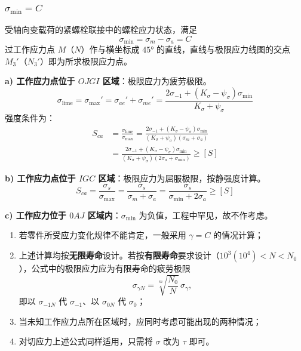 \subsubsection{$\sigma_{\min} = C$}

受轴向变载荷的紧螺栓联接中的螺栓应力状态，满足
\begin{equation}
	\sigma_{\min}=\sigma_m-\sigma_a=C
	\label{eq:强度:sigmaMin等于C}
\end{equation}
过工作应力点 $M$（$N$）作与横坐标成 $45°$ 的直线，直线与极限应力线图的交点 $M_3'$（$N_3'$）即为所求极限应力点。

\begin{theorem}[$\sigma_{\min}=C$ 时的疲劳强度计算]
\label{thm:sigmaMin}
\textbf{a) 工作应力点位于 $OJGI$ 区域}：极限应力为疲劳极限。
\begin{equation}
	\sigma_{\mathrm{lime}}=\sigma_{\max}'=\sigma_{ae}'+\sigma_{me}'=\frac{2\sigma_{-1}+(K_\sigma-\psi_\sigma)\sigma_{\min}}{K_\sigma+\psi_\sigma}
	\label{eq:强度:sigmaMin极限应力}
\end{equation}
强度条件为：
\begin{equation}
	\begin{aligned}
		S_{ca}&=\frac{\sigma_{\mathrm{lime}}}{\sigma_{\max}}=\frac{2\sigma_{-1}+(K_\sigma-\psi_\sigma)\sigma_{\min}}{(K_\sigma+\psi_\sigma)(\sigma_m+\sigma_a)}\\
		&=\frac{2\sigma_{-1}+(K_\sigma-\psi_\sigma)\sigma_{\min}}{(K_\sigma+\psi_\sigma)(2\sigma_a+\sigma_{\min})}\ge[S]
	\end{aligned}
	\label{eq:强度:sigmaMin疲劳}
\end{equation}

\textbf{b) 工作应力点位于 $IGC$ 区域}：极限应力为屈服极限，按静强度计算。
\begin{equation}
	S_{ca}=\frac{\sigma_s}{\sigma_{\max}}=\frac{\sigma_s}{\sigma_m+\sigma_a}=\frac{\sigma_s}{\sigma_{\min}+2\sigma_a}\ge[S]
	\label{eq:强度:sigmaMin屈服}
\end{equation}

\textbf{c) 工作应力位于 $0AJ$ 区域内}：$\sigma_{\min}$ 为负值，工程中罕见，故不作考虑。
\end{theorem}

\begin{note}
\begin{enumerate}
	\item 若零件所受应力变化规律不能肯定，一般采用 $\gamma=C$ 的情况计算；
	\item 上述计算均按\textbf{无限寿命}设计。若按\textbf{有限寿命}要求设计（$10^3(10^4)<\allowbreak N<N_0$），公式中的极限应力应为有限寿命的疲劳极限 
\[ \sigma_{\gamma N}=\sqrt[m]{\frac{N_0}{N}}\,\sigma_\gamma, \]
即以 $\sigma_{-1N}$ 代 $\sigma_{-1}$、以 $\sigma_{0N}$ 代 $\sigma_0$；
	\item 当未知工作应力点所在区域时，应同时考虑可能出现的两种情况；
	\item 对切应力上述公式同样适用，只需将 $\sigma$ 改为 $\tau$ 即可。
\end{enumerate}
\end{note}

